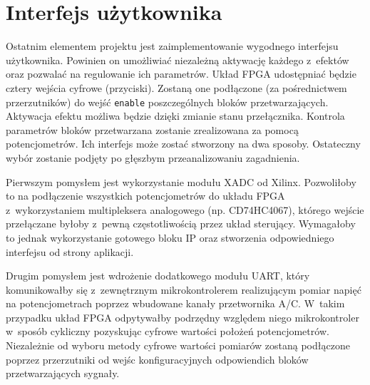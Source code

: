
\section{Interfejs użytkownika}

Ostatnim elementem projektu jest zaimplementowanie wygodnego interfejsu użytkownika. Powinien on umożliwiać niezależną aktywację każdego z~efektów oraz pozwalać na regulowanie ich parametrów. Układ FPGA udostępniać będzie cztery wejścia cyfrowe (przyciski). Zostaną one podłączone (za pośrednictwem przerzutników) do wejść \verb|enable| poszczególnych bloków przetwarzających. Aktywacja efektu możliwa będzie dzięki zmianie stanu przełącznika. Kontrola parametrów bloków przetwarzana zostanie zrealizowana za pomocą potencjometrów. Ich interfejs może zostać stworzony na dwa sposoby. Ostateczny wybór zostanie podjęty po głęszbym przeanalizowaniu zagadnienia. 

Pierwszym pomysłem jest wykorzystanie modułu XADC od Xilinx. Pozwoliłoby to na podłączenie wszystkich potencjometrów do układu FPGA z~wykorzystaniem multipleksera analogowego (np. CD74HC4067), którego wejście przełączane byłoby z~pewną częstotliwością przez układ sterujący. Wymagałoby to jednak wykorzystanie gotowego bloku IP oraz stworzenia odpowiedniego interfejsu od strony aplikacji.

Drugim pomysłem jest wdrożenie dodatkowego modułu UART, który komunikowałby się z~zewnętrznym mikrokontrolerem realizującym pomiar napięć na potencjometrach poprzez wbudowane kanały przetwornika A/C. W~takim przypadku układ FPGA odpytywałby podrzędny względem niego mikrokontroler w~sposób cykliczny pozyskując cyfrowe wartości położeń potencjometrów. Niezależnie od wyboru metody cyfrowe wartości pomiarów zostaną podłączone poprzez przerzutniki od wejśc konfiguracyjnych odpowiendich bloków przetwarzających sygnały.
